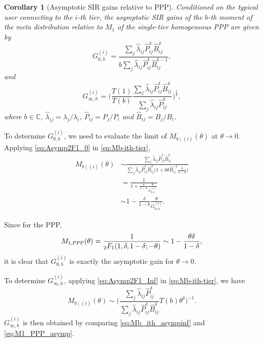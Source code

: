\documentclass[12pt,draftclsnofoot,journal,onecolumn]{IEEEtran}
\newtheorem{corollary}{Corollary}
\begin{document}
\begin{corollary}[Asymptotic SIR gains relative to PPP]
	\label{cor:AsymptGain}
	Conditioned on the typical user connecting to the $i$-th tier, the asymptotic SIR gains of the $b$-th moment of the meta distribution relative to $M_1$ of the single-tier homogeneous PPP are given by
	\begin{equation}\label{eq:AsymptGain}
	G_{0,b}^{(i)} = \frac{\sum_{j} \hat{\lambda}_{ij}\hat{P}_{ij}^\delta \hat{B}_{ij}^\delta}{b\sum_j \hat{\lambda}_{ij}\hat{P}_{ij}^\delta \hat{B}_{ij}^{\delta-1}},
	\end{equation}
	and
	\begin{equation}\label{eq:AsymptGainInf}
	G_{\infty,b}^{(i)} = \Big(\frac{T(1)}{T(b)}\frac{\sum_{j} \hat{\lambda}_{ij}\hat{P}_{ij}^\delta \hat{B}_{ij}^\delta}{\sum_j \hat{\lambda}_{ij}\hat{P}_{ij}^\delta}\Big)^{\frac{1}{\delta}},
\end{equation}	
	where $b\in\mathbb{C}$, $\hat\lambda_{ij} = \lambda_j/\lambda_i$, $\hat P_{ij} = P_j/P_i$ and $\hat B_{ij} = B_j/B_i$.
\end{corollary}   
\begin{IEEEproof}	
	To determine $G_{0,b}^{(i)}$, we need to evaluate the limit of $M_{b\mid(i)}(\theta)$ at $\theta\to 0$. 
	Applying \eqref{eq:Asymp2F1_0} in \eqref{eq:Mb-ith-tier},
	\begin{align}\label{eq:Mb_ith_asymp}
	M_{b\mid(i)}(\theta) &\sim \frac{\sum_{j} \hat{\lambda}_{ij}\hat{P}_{ij}^\delta \hat{B}_{ij}^\delta}{\sum_{j} \hat{\lambda}_{ij}\hat{P}_{ij}^\delta \hat{B}_{ij}^\delta \Big(1+b\theta\hat{B}_{ij}^{-1} \frac{\delta}{1-\delta} \Big)} \nonumber\\
	&=\frac{1}{1+ \frac{\delta}{1-\delta}\frac{\theta}{G_{0,b}^{(i)}}} \nonumber\\
	&\sim 1- \frac{\delta}{1-\delta}\frac{\theta}{G_{0,b}^{(i)}}.
	\end{align}	
	
	Since for the PPP, 
	\begin{equation}\label{eq:M1_PPP_asymp}
	M_{1,{\rm PPP}}(\theta) = \frac{1}{_2F_1(1,\delta,1-\delta;-\theta)} \sim 1-\frac{\theta\delta}{1-\delta},
	\end{equation}	
	it is clear that $G_{0,b}^{(i)}$ is exactly the asymptotic gain for $\theta\to 0$.
	
	To determine $G_{\infty,b}^{(i)}$, applying \eqref{eq:Asymp2F1_Inf} in \eqref{eq:Mb-ith-tier}, we have
	\begin{equation}\label{eq:Mb_ith_asympinf}
	M_{b\mid(i)}(\theta) \sim \bigg(\frac{\sum_{j} \hat{\lambda}_{ij}\hat{P}_{ij}^\delta}{\sum_{j} \hat{\lambda}_{ij}\hat{P}_{ij}^\delta \hat{B}_{ij}^\delta}T(b)\theta^\delta\bigg)^{-1}. 
	\end{equation}
	$G_{\infty,b}^{(i)}$ is then obtained by comparing \eqref{eq:Mb_ith_asympinf} and \eqref{eq:M1_PPP_asymp}.		
\end{IEEEproof}
\end{document}
